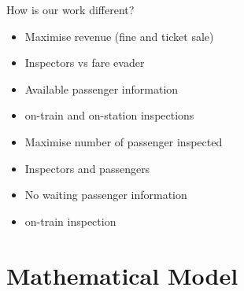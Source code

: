 \documentclass[handout]{beamer}
\begin{document}
\begin{frame}{How is our work different?}

\begin{minipage}[t]{0.48\linewidth}
\begin{tcolorbox}[colback=yellow!5!white,colframe=yellow!75!black,title=Previous Work]
\begin{itemize}
    \item Maximise revenue (fine and ticket sale)
    \item Inspectors vs fare evader
    \item Available passenger information
    \item on-train and on-station inspections
\end{itemize}\end{tcolorbox}
\end{minipage}%
\hfill%
\begin{minipage}[t]{0.48\linewidth}
\begin{tcolorbox}[colback=blue!5!white,colframe=blue!75!black,title=Our Work]
\begin{itemize}
    \item Maximise number of passenger inspected
    \item Inspectors and passengers
     \item No waiting passenger information
         \item on-train inspection 
\end{itemize}
\end{tcolorbox}
\end{minipage}
\end{frame}


\section{Mathematical Model}
\end{document}
